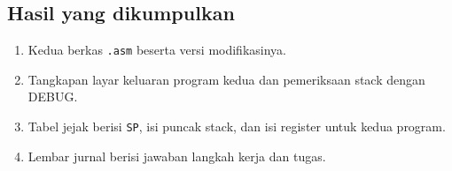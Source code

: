 \subsection{Hasil yang dikumpulkan}

\begin{enumerate}
    \item Kedua berkas \texttt{.asm} beserta versi modifikasinya.
    \item Tangkapan layar keluaran program kedua dan pemeriksaan stack
          dengan DEBUG.
    \item Tabel jejak berisi \texttt{SP}, isi puncak stack, dan isi
          register untuk kedua program.
    \item Lembar jurnal berisi jawaban langkah kerja dan tugas.
\end{enumerate}
